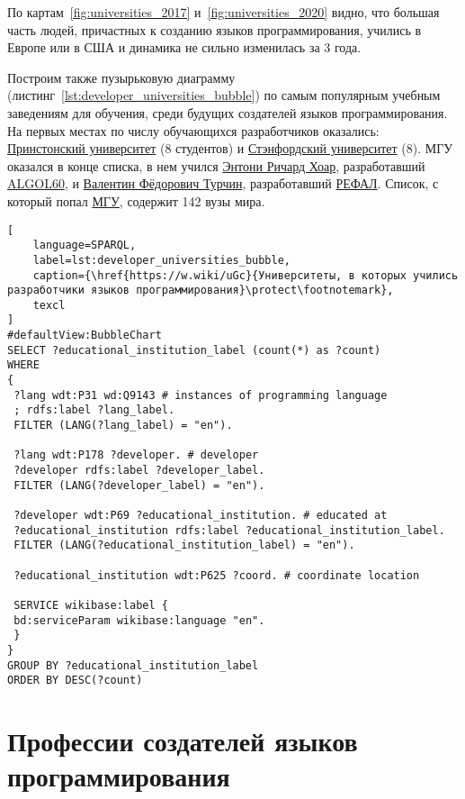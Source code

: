 По картам~\ref{fig:universities_2017} и~\ref{fig:universities_2020} видно, что большая часть людей, причастных к созданию языков программирования, учились в Европе или в США и динамика не сильно изменилась за 3 года.

Построим также пузырьковую диаграмму (листинг~\ref{lst:developer_universities_bubble}) по самым популярным учебным заведениям для обучения, среди будущих создателей языков программирования. На первых местах по числу обучающихся разработчиков оказались: \href{https://www.wikidata.org/wiki/Q21578}{Принстонский университет} (8 студентов) и \href{https://www.wikidata.org/wiki/Q41506}{Стэнфордский университет} (8). МГУ оказался в конце списка, в нем учился \href{https://www.wikidata.org/wiki/Q92602}{Энтони Ричард Хоар}, разработавший \href{https://www.wikidata.org/wiki/Q188436}{ALGOL60}, и \href{https://www.wikidata.org/wiki/Q4466506}{Валентин Фёдорович Турчин}, разработавший \href{https://www.wikidata.org/wiki/Q2626418}{РЕФАЛ}. Список, с который попал \href{https://www.wikidata.org/wiki/Q13164}{МГУ}, содержит 142 вузы мира.

\begin{lstlisting}[
	language=SPARQL,
	label=lst:developer_universities_bubble,
	caption={\href{https://w.wiki/uGc}{Университеты, в которых учились разработчики языков программирования}\protect\footnotemark},
	texcl
]
#defaultView:BubbleChart
SELECT ?educational_institution_label (count(*) as ?count)
WHERE
{
 ?lang wdt:P31 wd:Q9143 # instances of programming language
 ; rdfs:label ?lang_label. 
 FILTER (LANG(?lang_label) = "en"). 
 
 ?lang wdt:P178 ?developer. # developer
 ?developer rdfs:label ?developer_label. 
 FILTER (LANG(?developer_label) = "en"). 
 	
 ?developer wdt:P69 ?educational_institution. # educated at
 ?educational_institution rdfs:label ?educational_institution_label. 
 FILTER (LANG(?educational_institution_label) = "en").
 
 ?educational_institution wdt:P625 ?coord. # coordinate location
 
 SERVICE wikibase:label {
 bd:serviceParam wikibase:language "en".
 } 	
}
GROUP BY ?educational_institution_label
ORDER BY DESC(?count)
\end{lstlisting}

\section{Профессии создателей языков программирования}

